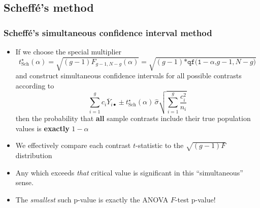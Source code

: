 \documentclass[a4paper]{article}\usepackage[]{graphicx}\usepackage[]{xcolor}
\begin{document}
\subsection{Scheffé's method}
\subsubsection{Scheffé's simultaneous confidence interval method}
\begin{itemize}
	\item If we choose the special multiplier
	\[
		t^\star_{\text{Sch}}(\alpha)= \sqrt{(g-1)F_{g-1,N-g}(\alpha)} = \sqrt{(g-1)\texttt{*qf(1}-\alpha\texttt{,}g-1,N-g\texttt{)}}
	\]
	and construct simultaneous confidence intervals for all possible contrasts according to
	\[
		\sum_{i=1}^gc_i \overline Y_{i\bullet} \pm t^\star_{\text{Sch}}(\alpha)\,\hat{\sigma} \textstyle\sqrt{\sum_{i=1}^g \frac{c_i^2}{n_i}}
	\]
	then the probability that \textbf{all} sample contrasts include their true population values is \textbf{exactly} \( 1 - \alpha \) 
	\item We effectively compare each contrast \( t \)-statistic to the \( \sqrt{(g-1)F} \) distribution
	\item Any which exceeds \textit{that} critical value is significant in this ``simultaneous'' sense.
	\item The \textit{smallest} such p-value is exactly the ANOVA \( F \)-test p-value!
\end{itemize}
\end{document}
